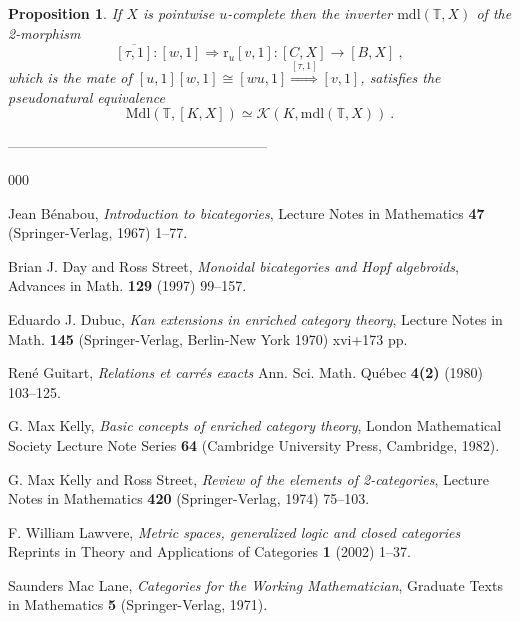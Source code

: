 \documentclass[a4paper,12pt]{article}
\newtheorem{proposition}[theorem]{Proposition}
\theoremstyle{definition}
\theoremstyle{fact}
\theoremstyle{genquest}
\theoremstyle{step}
\newcommand{\lra}{\longrightarrow}
\newcommand{\Lra}{\Longrightarrow}
\def\CK{{\mathscr K}}
\begin{document}
{ \begin{proposition}
If $X$ is pointwise $u$-complete then the inverter $\mathrm{mdl}(\mathbb{T},X)$ of the 2-morphism
$$\overline{[\tau,1]}:[w,1]  \Lra \mathrm{r}_u [v,1] : [C,X]\lra [B,X] \ ,$$
which is the mate of $[u,1][w,1]\cong [wu,1]  \stackrel{[\tau,1]} \Lra [v,1] $,
satisfies the pseudonatural equivalence
$$\mathrm{Mdl}(\mathbb{T},[K,X]) \simeq \CK(K,\mathrm{mdl}(\mathbb{T},X)) \ .$$ 
\end{proposition}

\begin{center}
--------------------------------------------------------
\end{center}

\appendix
\begin{thebibliography}{000}

 Jean B\'enabou, \textit{Introduction to bicategories}, Lecture Notes in Mathematics \textbf{47} (Springer-Verlag, 1967) 1--77.\label{Ben1967}

 Brian J. Day and Ross Street, \textit{Monoidal bicategories and Hopf algebroids}, Advances in Math. \textbf{129} (1997) 99--157.\label{MbHa}

 Eduardo J. Dubuc, \textit{Kan extensions in enriched category theory}, Lecture Notes in Math. \textbf{145} (Springer-Verlag, Berlin-New York 1970) xvi+173 pp.\label{DubucThesis}

 Ren\'e Guitart, \textit{Relations et carr\'es exacts} Ann. Sci. Math. Qu\'ebec \textbf{4(2)} (1980) 103--125.\label{Guitart1980}

 G. Max Kelly, \textit{Basic concepts of enriched category theory}, London Mathematical Society Lecture Note Series \textbf{64} (Cambridge University Press, Cambridge, 1982). \label{KellyBook}

 G. Max Kelly and Ross Street, \textit{Review of the elements of 2-categories}, Lecture Notes in Mathematics \textbf{420} (Springer-Verlag, 1974) 75--103.\label{KelSt1974}

 F. William Lawvere, \textit{Metric spaces, generalized logic and closed categories} 
Reprints in Theory and Applications of Categories \textbf{1} (2002) 1--37.\label{LawMetric} 

 Saunders Mac Lane, \textit{Categories for the Working Mathematician}, Graduate Texts in Mathematics \textbf{5} (Springer-Verlag, 1971).\label{CWM} 


\end{thebibliography}}
\end{document}
